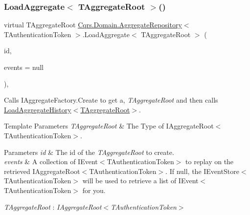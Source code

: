 \subsubsection{\texorpdfstring{Load\+Aggregate$<$ T\+Aggregate\+Root $>$()}{LoadAggregate< TAggregateRoot >()}}
{\footnotesize\ttfamily virtual T\+Aggregate\+Root \hyperlink{classCqrs_1_1Domain_1_1AggregateRepository}{Cqrs.\+Domain.\+Aggregate\+Repository}$<$ T\+Authentication\+Token $>$.Load\+Aggregate$<$ T\+Aggregate\+Root $>$ (\begin{DoxyParamCaption}\item[{Guid}]{id,  }\item[{I\+List$<$ \hyperlink{interfaceCqrs_1_1Events_1_1IEvent}{I\+Event}$<$ T\+Authentication\+Token $>$$>$}]{events = {\ttfamily null} }\end{DoxyParamCaption})\hspace{0.3cm}{\ttfamily [protected]}, {\ttfamily [virtual]}}



Calls I\+Aggregate\+Factory.\+Create to get a, {\itshape T\+Aggregate\+Root}  and then calls \hyperlink{classCqrs_1_1Domain_1_1AggregateRepository_af26efcb464ac989962a9ad138466e4d7_af26efcb464ac989962a9ad138466e4d7}{Load\+Aggregate\+History$<$\+T\+Aggregate\+Root$>$}. 


\begin{DoxyTemplParams}{Template Parameters}
{\em T\+Aggregate\+Root} & The Type of I\+Aggregate\+Root$<$\+T\+Authentication\+Token$>$.\\
\hline
\end{DoxyTemplParams}

\begin{DoxyParams}{Parameters}
{\em id} & The id of the {\itshape T\+Aggregate\+Root}  to create.\\
\hline
{\em events} & A collection of I\+Event$<$\+T\+Authentication\+Token$>$ to replay on the retrieved I\+Aggregate\+Root$<$\+T\+Authentication\+Token$>$. If null, the I\+Event\+Store$<$\+T\+Authentication\+Token$>$ will be used to retrieve a list of I\+Event$<$\+T\+Authentication\+Token$>$ for you. \\
\hline
\end{DoxyParams}
\begin{Desc}
\item[Type Constraints]\begin{description}
\item[{\em T\+Aggregate\+Root} : {\em I\+Aggregate\+Root$<$T\+Authentication\+Token$>$}]\end{description}
\end{Desc}
\mbox{\label{classCqrs_1_1Domain_1_1AggregateRepository_af26efcb464ac989962a9ad138466e4d7_af26efcb464ac989962a9ad138466e4d7}} 
